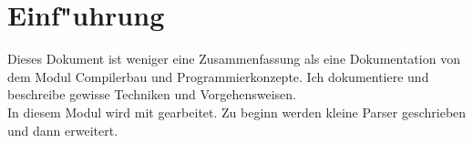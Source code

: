 
\section{Einf"uhrung}
Dieses Dokument ist weniger eine Zusammenfassung als eine Dokumentation von dem Modul Compilerbau und Programmierkonzepte. Ich dokumentiere und beschreibe gewisse Techniken und Vorgehensweisen.\\
In diesem Modul wird mit \antlr gearbeitet. Zu beginn werden kleine Parser geschrieben und dann erweitert.
